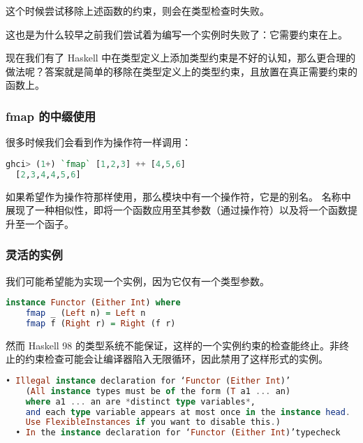 \documentclass[./main.tex]{subfiles}
\begin{document}
这个时候尝试移除上述函数的约束，则会在类型检查时失败。

这也是为什么较早之前我们尝试着为编写一个实例时失败了：它需要约束在上。

现在我们有了 Haskell 中在类型定义上添加类型约束是不好的认知，那么更合理的做法呢？答案就是简单的移除在类型定义上的类型约束，且放置在真正需要约束的
函数上。

\subsubsection*{fmap 的中缀使用}

很多时候我们会看到作为操作符一样调用：

\begin{lstlisting}[language=Haskell]
  ghci> (1+) `fmap` [1,2,3] ++ [4,5,6]
  [2,3,4,4,5,6]
\end{lstlisting}

如果希望作为操作符那样使用，那么模块中有一个操作符\acode{(<\$>)}，它是的别名。
名称中\acode{\$}展现了一种相似性，即将一个函数应用至其参数（通过\acode{(\$)}操作符）以及将一个函数提升至一个函子。

\subsubsection*{灵活的实例}

我们可能希望能为实现一个实例，因为它仅有一个类型参数。

\begin{lstlisting}[language=Haskell]
  instance Functor (Either Int) where
    fmap _ (Left n) = Left n
    fmap f (Right r) = Right (f r)
\end{lstlisting}

然而 Haskell 98 的类型系统不能保证，这样的一个实例约束的检查能终止。非终止的约束检查可能会让编译器陷入无限循环，因此禁用了这样形式的实例。

\begin{lstlisting}[language=Haskell]
  • Illegal instance declaration for ‘Functor (Either Int)’
    (All instance types must be of the form (T a1 ... an)
    where a1 ... an are *distinct type variables*,
    and each type variable appears at most once in the instance head.
    Use FlexibleInstances if you want to disable this.)
  • In the instance declaration for ‘Functor (Either Int)’typecheck
\end{lstlisting}
\end{document}
